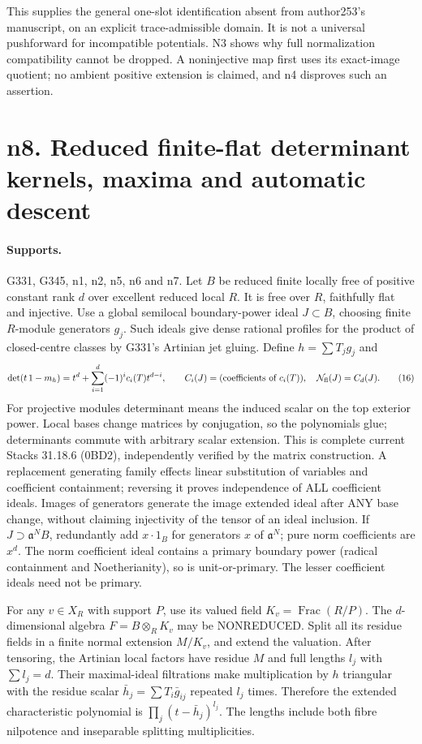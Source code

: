 This supplies the general one-slot identification absent from author253's manuscript, on an explicit trace-admissible domain. It is not a universal pushforward for incompatible potentials. N3 shows why full normalization compatibility cannot be dropped. A noninjective map first uses its exact-image quotient; no ambient positive extension is claimed, and n4 disproves such an assertion.


\section{n8. Reduced finite-flat determinant kernels, maxima and automatic descent}
\paragraph{Supports.} G331, G345, n1, n2, n5, n6 and n7.
Let $B$ be reduced finite locally free of positive constant rank $d$ over excellent reduced local $R$. It is free over $R$, faithfully flat and injective. Use a global semilocal boundary-power ideal $J\subset B$, choosing finite $R$-module generators $g_j$. Such ideals give dense rational profiles for the product of closed-centre classes by G331's Artinian jet gluing. Define $h=\sum T_jg_j$ and
\[
 \det(t\,1-m_h)=t^d+\sum_{i=1}^d(-1)^ic_i(T)t^{d-i},\qquad
 C_i(J)=(\text{coefficients of }c_i(T)),\quad \mathcal N_{\rm fl}(J)=C_d(J). \tag{16}
\]
For projective modules determinant means the induced scalar on the top exterior power. Local bases change matrices by conjugation, so the polynomials glue; determinants commute with arbitrary scalar extension. This is complete current Stacks 31.18.6 (0BD2), independently verified by the matrix construction. A replacement generating family effects linear substitution of variables and coefficient containment; reversing it proves independence of ALL coefficient ideals. Images of generators generate the image extended ideal after ANY base change, without claiming injectivity of the tensor of an ideal inclusion. If $J\supset\mathfrak a^NB$, redundantly add $x\cdot1_B$ for generators $x$ of $\mathfrak a^N$; pure norm coefficients are $x^d$. The norm coefficient ideal contains a primary boundary power (radical containment and Noetherianity), so is unit-or-primary. The lesser coefficient ideals need not be primary.

For any $v\in X_R$ with support $P$, use its valued field $K_v=\operatorname{Frac}(R/P)$. The $d$-dimensional algebra $F=B\otimes_RK_v$ may be NONREDUCED. Split all its residue fields in a finite normal extension $M/K_v$, and extend the valuation. After tensoring, the Artinian local factors have residue $M$ and full lengths $l_j$ with $\sum l_j=d$. Their maximal-ideal filtrations make multiplication by $h$ triangular with the residue scalar $\bar h_j=\sum T_i\bar g_{ij}$ repeated $l_j$ times. Therefore the extended characteristic polynomial is $\prod_j(t-\bar h_j)^{l_j}$. The lengths include both fibre nilpotence and inseparable splitting multiplicities.

